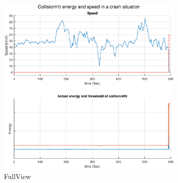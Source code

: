 \begin{figure}[H]
	\centering
	\begin{subfigure}{0.58\textwidth}
		\centering
		\includegraphics[width=\textwidth]{Bilder/CH_speed_CHEnergy_MitCH_FullView_eps.eps}
		\caption{FullView}
		\label{fig:CH_speed_CHEnergy_MitCH_FullView_eps}
	\end{subfigure}
	\hfill
	\begin{subfigure}{0.41\textwidth}
		\centering

\end{subfigure}
\end{figure}
